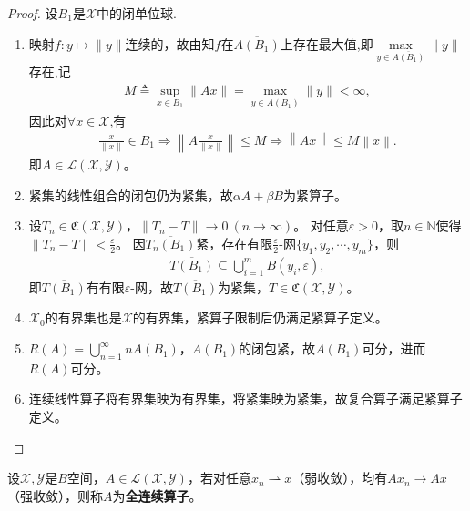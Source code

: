 \documentclass[../../main.tex]{subfiles}%
\begin{document}
\begin{proof}

设$B_1$是$\mathscr{X}$中的闭单位球.
\begin{enumerate}[(1)]
\item 映射$f:y\mapsto\|y\|$连续的，故由知$f$在$\overline{A(B_1)}$上存在最大值,即$\max\limits_{y\in\overline{A(B_1)}}\|y\|$存在,记
\begin{align*}
M\triangleq\sup\limits_{x\in B_1}\|Ax\|=\max\limits_{y\in\overline{A(B_1)}}\|y\|<\infty,
\end{align*}
因此对$\forall x\in \mathscr{X}$,有
\begin{align*}
\frac{x}{\left\| x \right\|}\in B_1\Longrightarrow \left\| A\frac{x}{\left\| x \right\|} \right\| \leqslant M\Longrightarrow \left\| Ax \right\| \leqslant M\left\| x \right\| .
\end{align*}
即$A\in\mathscr{L}(\mathscr{X},\mathscr{Y})$。

\item 紧集的线性组合的闭包仍为紧集，故$\alpha A+\beta B$为紧算子。

\item 设$T_n\in\mathfrak{C}(\mathscr{X},\mathscr{Y})$，$\|T_n-T\|\to0\ (n\to\infty)$。
对任意$\varepsilon>0$，取$n\in\mathbb{N}$使得$\|T_n-T\|<\frac{\varepsilon}{2}$。
因$\overline{T_n(B_1)}$紧，存在有限$\frac{\varepsilon}{2}$-网$\{y_1,y_2,\cdots,y_m\}$，则
\begin{align*}
\overline{T(B_1)}\subseteq\bigcup\limits_{i=1}^{m}B(y_i,\varepsilon),
\end{align*}
即$\overline{T(B_1)}$有有限$\varepsilon$-网，故$\overline{T(B_1)}$为紧集，$T\in\mathfrak{C}(\mathscr{X},\mathscr{Y})$。

\item $\mathscr{X}_0$的有界集也是$\mathscr{X}$的有界集，紧算子限制后仍满足紧算子定义。

\item $R(A)=\bigcup\limits_{n=1}^{\infty}nA(B_1)$，$A(B_1)$的闭包紧，故$A(B_1)$可分，进而$R(A)$可分。

\item 连续线性算子将有界集映为有界集，将紧集映为紧集，故复合算子满足紧算子定义。
\end{enumerate}
\end{proof}

\begin{definition}[全连续算子]
设$\mathscr{X},\mathscr{Y}$是$B$空间，$A\in\mathscr{L}(\mathscr{X},\mathscr{Y})$，若对任意$x_n\rightharpoonup x$（弱收敛），均有$Ax_n\to Ax$（强收敛），则称$A$为\textbf{全连续算子}。
\end{definition}
\end{document}
